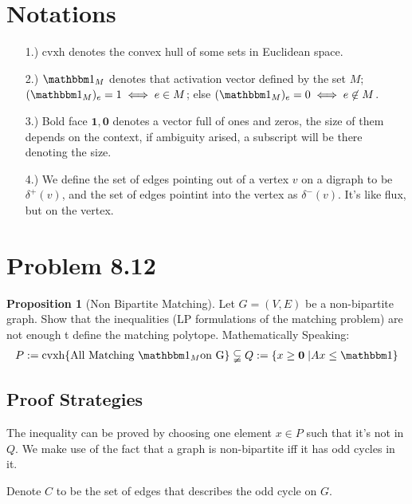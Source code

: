 \documentclass[]{article}
\theoremstyle{definition}
\newtheorem{prop}{Proposition}[section]  %
\begin{document}
\section{Notations}
\begin{enumerate}
    \item [1.)] $\text{cvxh}$ denotes the convex hull of some sets in Euclidean space. 
    \item [2.)] $\mathbbm 1_M$ denotes that activation vector defined by the set $M$; $(\mathbbm 1_M)_e = 1 \iff e\in M$; else $(\mathbbm 1_M)_e = 0\iff e\not\in M$. 
    \item [3.)] Bold face $\mathbf 1, \mathbf 0$ denotes a vector full of ones and zeros, the size of them depends on the context, if ambiguity arised, a subscript will be there denoting the size. 
    \item [4.)] We define the set of edges pointing out of a vertex $v$ on a digraph to be $\delta^+(v)$, and the set of edges pointint into the vertex as $\delta^{-}(v)$. It's like flux, but on the vertex. 
\end{enumerate}
\section{Problem 8.12}
    \begin{prop}[Non Bipartite Matching]
        Let $G=(V, E)$ be a non-bipartite graph. Show that the inequalities (LP formulations of the matching problem) are not enough t define the matching polytope. Mathematically Speaking: 
        \begin{align}
            P:=\text{cvxh}\{\text{All Matching }\mathbbm 1_M \text{on G}\} \subsetneqq Q:=\{x\ge \mathbf 0 \;| Ax \le \mathbbm 1\}
        \end{align}
    \end{prop}
    \subsection{Proof Strategies}
        The inequality can be proved by choosing one element $x\in P$ such that it's not in $Q$. We make use of the fact that a graph is non-bipartite iff it has odd cycles in it. 
        \par
        Denote $C$ to be the set of edges that describes the odd cycle on $G$. 
\end{document}
